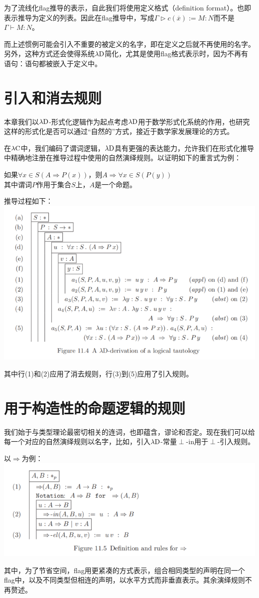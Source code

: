 \documentclass[UTF8]{article}
\begin{document}
		为了流线化flag推导的表示，自此我们将使用定义格式（definition format）。也即表示推导为定义的列表。因此在flag推导中，写成$\Gamma\triangleright c(\overline{x}):=M:N$而不是$\Gamma\vdash M:N$。
		
		而上述惯例可能会引入不重要的被定义的名字，即在定义之后就不再使用的名字。另外，这种方式还会使得系统$\lambda{\rm D}$简化，尤其是使用flag格式表示时，因为不再有语句：语句都被嵌入于定义中。
		
	\section{引入和消去规则}
	\noindent
	本章我们以$\lambda{\rm D}$-形式化逻辑作为起点考虑$\lambda{\rm D}$用于数学形式化系统的作用，也研究这样的形式化是否可以通过“自然的”方式，接近于数学家发展理论的方式。
	
		在$\lambda{\rm C}$中，我们编码了谓词逻辑，$\lambda{\rm D}$具有更强的表达能力，允许我们在形式化推导中精确地注册在推导过程中使用的自然演绎规则。以证明如下的重言式为例：
		
		如果$\forall{x\in S}(A\Rightarrow P(x))$，则$A\Rightarrow\forall{x\in S}(P(y))$\\
		其中谓词$P$作用于集合$S$上，$A$是一个命题。
		
		推导过程如下：\\
		\includegraphics[width=0.93\linewidth]{"../imgs/11-5.png"}
		
		其中行(1)和(2)应用了消去规则，行(3)到(5)应用了引入规则。
		
	\section{用于构造性的命题逻辑的规则}
	\noindent
	我们始于与类型理论最密切相关的连词，也即蕴含，谬论和否定。现在我们可以给每一个对应的自然演绎规则以名字，比如，引入$\lambda{\rm D}$-常量$\perp$-in用于$\perp$-引入规则。
		
		以$\Rightarrow$为例：\\
		\includegraphics[width=0.93\linewidth]{"../imgs/11-6.png"}
		
		其中，为了节省空间，flag用更紧凑的方式表示，组合相同类型的声明在同一个flag中，以及不同类型但相连的声明，以水平方式而非垂直表示。其余演绎规则不再赘述。
\end{document}
